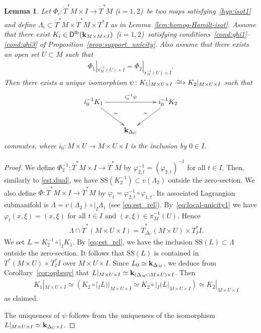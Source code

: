 \documentclass[12pt,leqno]{article}
\newtheorem{lemma}[theorem]{Lemma}
\theoremstyle{definition}
\def\phi{{\varphi}}
\newcommand{\cor}{{\bf k}}
\renewcommand{\to}[1][]{\xrightarrow[]{#1}}
\newcommand{\isoto}[1][]{\xrightarrow[#1]%
{{\raisebox{-.6ex}[0ex][-.6ex]{$\mspace{1mu}\sim\mspace{2mu}$}}}}
\newcommand{\conv}[1][]{\mathop{\circ}\limits_{#1}}
\newcommand{\opb}[1]{#1^{-1}}
\newcommand{\cl}{\colon}
\newcommand{\lp}{{\rm(}}
\newcommand{\rp}{{\rm)}}
\newcommand{\eq}{\begin{eqnarray}}
\newcommand{\eneq}{\end{eqnarray}}
\newcommand{\eqn}{\begin{eqnarray*}}
\newcommand{\eneqn}{\end{eqnarray*}}
\newcommand{\Der}[1][]{\mathsf{D}^{#1}}
\newcommand{\Derlb}{\Der[\mathrm{lb}]}
\newcommand{\SSi}{\mathrm{SS}}
\newcommand{\dT}{{\dot{T}}}
\newcommand{\dTM}{{\dT}^*M}
\numberwithin{equation}{section}
\begin{document}
\begin{lemma}\label{lem:local-unicity}
Let $\Phi_i\cl \dTM \times I \to \dTM$ \lp$i=1,2$\rp\, be two maps
satisfying~\eqref{hyp:isot1} and
define $\Lambda_i \subset \dTM\times\dTM\times T^*I$ as in
Lemma~\ref{lem:homog-Hamilt-isot}.
Assume that there exist
$K_i \in\Derlb(\cor_{M\times M\times I})$ \lp$i=1,2$\rp\,
satisfying conditions~\eqref{cond:qhi1}--\eqref{cond:qhi3} of
Proposition~\ref{prop:support_unicity}.
Also assume that there exists an open set $U\subset M$ 
such that
\eq\label{eq:local-unicity1}
\Phi_1|_{\opb{\dot\pi_M}(U) \times I} = \Phi_2|_{\opb{\dot\pi_M}(U) \times I}. 
\eneq
Then there exists a unique isomorphism
$\psi\cl K_1|_{M\times U \times I} \isoto K_2|_{M\times U \times I}$ 
such that
$$\xymatrix{
{\opb{i_0}K_1}\ar[rr]^{\opb{i_0}\psi}\ar[dr]^-{\sim}
&&{\opb{i_0}K_2}\ar[dl]_-{\sim}\\
&\cor_{\Delta_U}
}$$
commutes, where $i_0\cl M\times U \to M\times U\times I$ 
is the inclusion by $0\in I$.
\end{lemma}
\begin{proof}
We define $\opb{\Phi_2}\cl \dTM \times I \to \dTM$ by
$\opb{\phi_{2,t}} = (\phi_{2,t})^{-1}$ for all $t\in I$.
Then, similarly to \eqref{est:dual},
we have $\SSi(\opb{K_2}) \subset v(\Lambda_2)$ outside the zero-section.
%
We also define $\Phi \cl \dTM \times I \to \dTM$ by
$\phi_t = \opb{\phi_{2,t}} \circ \phi_{1,t}$.
Its associated Lagrangian submanifold is
$\Lambda = v(\Lambda_2) \conv|_I \Lambda_1$ (see \eqref{eq:est_rel}).
By~\eqref{eq:local-unicity1} we have $\phi_t(x,\xi) = (x,\xi)$ for all
$t\in I$ and $(x,\xi) \in \opb{\dot\pi_M}(U)$. Hence
\eqn
&&\Lambda\cap\dT^*(M\times U\times I)=\dT^*_{\Delta_U}(M\times U)\times T^*_II.
\eneqn
We set $L= \opb{K_2} \conv|_I K_1$.
By  \eqref{eq:est_rel},  we have the inclusion 
$\SSi(L)\subset\Lambda$ outside the zero-section. It follows that $\SSi(L)$ is contained in
$T^*(M\times U)\times T^*_II$ over $M\times U \times I$.
Since $L_0 \simeq \cor_{\Delta_M}$, we deduce from
Corollary~\ref{cor:opbeqv} that
$L|_{M\times U \times I} \simeq \cor_{( \Delta_M \cap M\times U) \times I}$.
Then
\eqn
&& K_1|_{M\times U \times I}\simeq (K_2 \conv|_I L)|_{M\times U \times I}
\simeq K_2 \conv|_I (L|_{M\times U \times I})
\simeq K_2|_{M\times U \times I}
\eneqn
as claimed.

The uniqueness of $\psi$ follows from the uniqueness of the isomorphism
$L|_{M\times U \times I} \simeq \cor_{\Delta_U \times I}$.
\end{proof}
\end{document}
